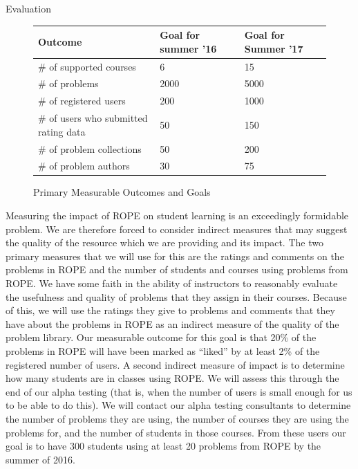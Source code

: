 \documentclass[11pt]{article}
\begin{document}
\begin{section}{Evaluation}
\begin{figure}
\begin{center}
\begin{tabular}{|l|l|l|}
  \hline
  \textbf{Outcome} & \textbf{Goal for summer '16} & \textbf{Goal for
  Summer '17} \\
  \hline
  \hline
  \# of supported courses & 6 & 15 \\
  \hline
  \# of problems & 2000 & 5000 \\
  \hline
  \# of registered users & 200 & 1000 \\
  \hline
  \# of users who submitted rating data & 50 & 150 \\
  \hline
  \# of problem collections & 50 & 200 \\
  \hline
  \# of problem authors & 30 & 75 \\
  \hline
\end{tabular}
\caption{Primary Measurable Outcomes and Goals}
\label{outcomes}
\end{center}
\end{figure}

Measuring the impact of ROPE on student learning is an exceedingly
formidable problem.  We are therefore forced to consider indirect measures
that may suggest the quality of the resource which we are providing and
its impact.  The two primary measures that we will use for this are the
ratings and comments on the problems in ROPE and the number of students
and courses using problems from ROPE.  We have some faith in the
ability of instructors to reasonably evaluate the usefulness and quality
of problems that they assign in their courses.  Because of this, we will
use the ratings they give to problems and comments that they have about
the problems in ROPE as an indirect measure of the quality of the
problem library.  Our measurable outcome for this goal is that 20\% of the
problems in ROPE will have been marked as ``liked'' by at least 2\% of
the registered number of users.  A second indirect measure of impact is to
determine how many students are in classes using ROPE.  We will assess
this through the end of our alpha testing (that is, when the number of
users is small enough for us to be able to do this).  We will contact our
alpha testing consultants to determine the number of problems they are
using, the number of courses they are using the problems for, and the
number of students in those courses.  From these users our goal is to have
300 students using at least 20 problems from ROPE by the summer of
2016. 

\end{section}
\end{document}
